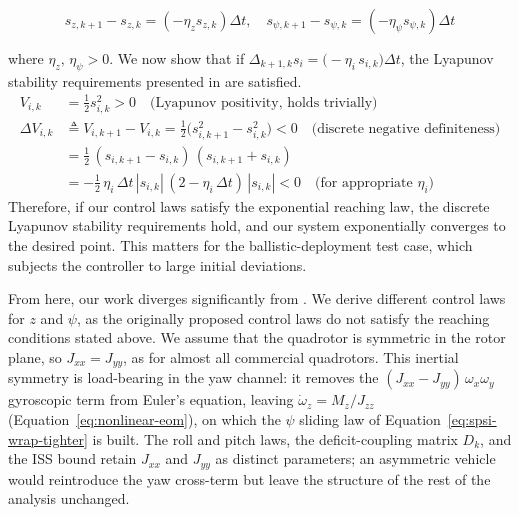 \documentclass[conf]{new-aiaa}
\begin{document}
\small
\begin{equation}
s_{z,k+1} - s_{z,k} = \left(-\eta_z s_{z,k}\right) \Delta t, \quad
s_{\psi,k+1} - s_{\psi,k} = \left(-\eta_\psi s_{\psi,k}\right) \Delta t
\end{equation}
\normalsize

where $\eta_z,\, \eta_\psi > 0$. We now show that if $\Delta_{k+1,k} s_i = \bigl(-\eta_i\, s_{i,k}\bigr) \Delta t$, the Lyapunov stability requirements presented in \cite{refs:Xiong2016} are satisfied.
\small
\begin{equation}
\label{eq:discrete-lyapunov}
\begin{aligned}
V_{i,k} &= \tfrac{1}{2} s_{i,k}^2 > 0 \quad \text{(Lyapunov positivity, holds trivially)} \\
\Delta V_{i,k} &\triangleq V_{i,k+1} - V_{i,k} = \tfrac{1}{2}\bigl(s_{i,k+1}^2 - s_{i,k}^2\bigr) < 0 \quad \text{(discrete negative definiteness)} \\
&= \tfrac{1}{2}\,(s_{i,k+1} - s_{i,k})\,(s_{i,k+1} + s_{i,k}) \\
&= -\tfrac{1}{2}\,\eta_i\,\Delta t\,|s_{i,k}|\,(2 - \eta_i\,\Delta t)\,|s_{i,k}| < 0 \quad \text{(for appropriate $\eta_i$)}
\end{aligned}
\end{equation}
\normalsize
Therefore, if our control laws satisfy the exponential reaching law, the discrete Lyapunov stability requirements hold, and our system exponentially converges to the desired point. This matters for the ballistic-deployment test case, which subjects the controller to large initial deviations.

From here, our work diverges significantly from \cite{refs:Xiong2016}. We derive different control laws for $z$ and $\psi$, as the originally proposed control laws do not satisfy the reaching conditions stated above. We assume that the quadrotor is symmetric in the rotor plane, so $J_{xx} = J_{yy}$, as for almost all commercial quadrotors. This inertial symmetry is load-bearing in the yaw channel: it removes the $(J_{xx}-J_{yy})\,\omega_x\omega_y$ gyroscopic term from Euler's equation, leaving $\dot\omega_z = M_z/J_{zz}$ (Equation~\ref{eq:nonlinear-eom}), on which the $\psi$ sliding law of Equation~\ref{eq:spsi-wrap-tighter} is built. The roll and pitch laws, the deficit-coupling matrix $D_k$, and the ISS bound retain $J_{xx}$ and $J_{yy}$ as distinct parameters; an asymmetric vehicle would reintroduce the yaw cross-term but leave the structure of the rest of the analysis unchanged.
\end{document}
